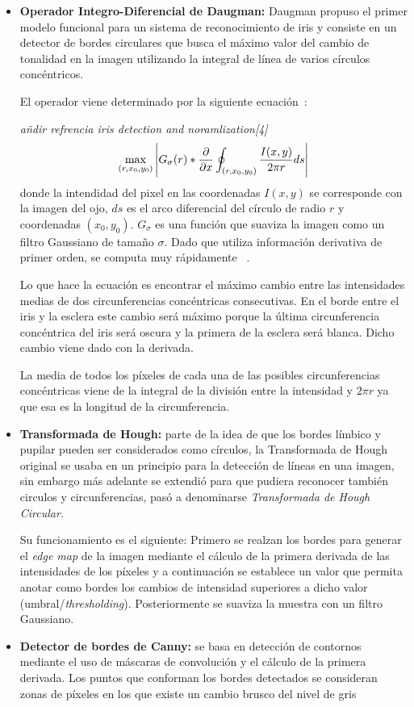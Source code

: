 \begin{itemize}
    \item\textbf{Operador Integro-Diferencial de Daugman:} Daugman propuso el primer modelo funcional para un sistema de reconocimiento de iris y consiste en un detector de bordes circulares que busca el máximo valor del cambio de tonalidad en la imagen utilizando la integral de línea de varios círculos concéntricos.
    
    El operador viene determinado por la siguiente ecuación~\cite{kazakov:2011}:
    
    \emph{añdir refrencia iris detection and noramlization[4]}
    \begin{equation*}
    \max_{\substack(r,x_{0},y_{0})}\left | G_{\sigma }(r)*\frac{\partial }{\partial x}\oint_{(r,x_{0},y_{0})} \frac{I(x,y)}{2\pi r}ds \right |
    \end{equation*}
    donde la intendidad del pixel en las coordenadas $I(x,y)$ se corresponde con la imagen del ojo, $ds$ es el arco diferencial del círculo de radio $r$ y coordenadas $(x_{0},y_{0})$. $G_{\sigma}$
    es una función que suaviza la imagen como un filtro Gaussiano de tamaño $\sigma$. Dado que utiliza información derivativa de primer orden, se computa muy rápidamente ~\cite{yonekura:2014}.
    
    Lo que hace la ecuación es encontrar el máximo cambio entre las intensidades medias de dos circunferencias concéntricas consecutivas. En el borde entre el iris y la esclera este cambio será máximo porque la última circunferencia concéntrica del iris será oscura y la primera de la esclera será blanca. Dicho cambio viene dado con la derivada.
    
    La media de todos los píxeles de cada una de las posibles circunferencias concéntricas viene de la integral de la división entre la intensidad y $2 \pi r$ ya que esa es la longitud de la circunferencia.
    
    \item\textbf{Transformada de Hough:} parte de la idea de que los bordes límbico y pupilar pueden ser considerados como círculos, la Transformada de Hough original se usaba en un principio para la detección de líneas en una imagen, sin embargo más adelante se extendió para que pudiera reconocer también circulos y circunferencias, pasó a denominarse \emph{Transformada de Hough Circular}.
    
    Su funcionamiento es el siguiente:
    Primero se realzan los bordes para generar el \emph{edge map} de la imagen mediante el cálculo de la primera derivada de las intensidades de los píxeles y a continuación se establece un valor que permita anotar como bordes los cambios de intensidad superiores a dicho valor (umbral/\emph{thresholding}). Posteriormente se suaviza la muestra con un filtro Gaussiano.
    
    \item\textbf{Detector de bordes de Canny:} se basa en detección de contornos mediante el uso de máscaras de convolución y el cálculo de la primera derivada.
    Los puntos que conforman los bordes detectados se consideran zonas de píxeles en los que existe un cambio brusco del nivel de gris ~\cite{valverde:2007}
\end{itemize}

